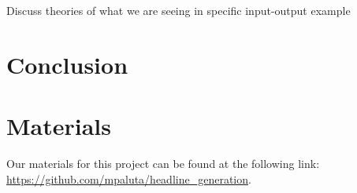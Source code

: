 \documentclass[11pt]{article}
\begin{document}
Discuss theories of what we are seeing in specific input-output example

\section{Conclusion}



\section{Materials}
Our materials for this project can be found at the following link:
\url{https://github.com/mpaluta/headline_generation}.




\end{document}
